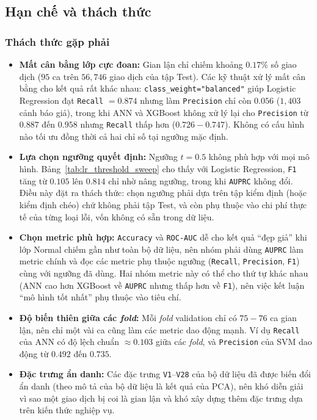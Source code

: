 \subsection{Hạn chế và thách thức}\label{subsec:han-che-thach-thuc}

\subsubsection{Thách thức gặp phải}
\begin{itemize}
    \item \textbf{Mất cân bằng lớp cực đoan:} Gian lận chỉ chiếm khoảng $0.17\%$ số giao dịch ($95$ ca trên $56{,}746$ giao dịch của tập Test). Các kỹ thuật xử lý mất cân bằng cho kết quả rất khác nhau: \texttt{class\_weight="balanced"} giúp Logistic Regression đạt \texttt{Recall} $= 0.874$ nhưng làm \texttt{Precision} chỉ còn $0.056$ ($1{,}403$ cảnh báo giả), trong khi ANN và XGBoost không xử lý lại cho \texttt{Precision} từ $0.887$ đến $0.958$ nhưng \texttt{Recall} thấp hơn ($0.726 - 0.747$). Không có cấu hình nào tối ưu đồng thời cả hai chỉ số tại ngưỡng mặc định.

    \item \textbf{Lựa chọn ngưỡng quyết định:} Ngưỡng $t = 0.5$ không phù hợp với mọi mô hình. Bảng~\ref{tab:lr_threshold_sweep} cho thấy với Logistic Regression, \texttt{F1} tăng từ $0.105$ lên $0.814$ chỉ nhờ nâng ngưỡng, trong khi \texttt{AUPRC} không đổi. Điều này đặt ra thách thức: chọn ngưỡng phải dựa trên tập kiểm định (hoặc kiểm định chéo) chứ không phải tập Test, và còn phụ thuộc vào chi phí thực tế của từng loại lỗi, vốn không có sẵn trong dữ liệu.

    \item \textbf{Chọn metric phù hợp:} \texttt{Accuracy} và \texttt{ROC-AUC} dễ cho kết quả ``đẹp giả'' khi lớp Normal chiếm gần như toàn bộ dữ liệu, nên nhóm phải dùng \texttt{AUPRC} làm metric chính và đọc các metric phụ thuộc ngưỡng (\texttt{Recall}, \texttt{Precision}, \texttt{F1}) cùng với ngưỡng đã dùng. Hai nhóm metric này có thể cho thứ tự khác nhau (ANN cao hơn XGBoost về \texttt{AUPRC} nhưng thấp hơn về \texttt{F1}), nên việc kết luận ``mô hình tốt nhất'' phụ thuộc vào tiêu chí.

    \item \textbf{Độ biến thiên giữa các \textit{fold}:} Mỗi \textit{fold} validation chỉ có $75 - 76$ ca gian lận, nên chỉ một vài ca cũng làm các metric dao động mạnh. Ví dụ \texttt{Recall} của ANN có độ lệch chuẩn $\approx 0.103$ giữa các \textit{fold}, và \texttt{Precision} của SVM dao động từ $0.492$ đến $0.735$.

    \item \textbf{Đặc trưng ẩn danh:} Các đặc trưng \texttt{V1}--\texttt{V28} của bộ dữ liệu đã được biến đổi ẩn danh (theo mô tả của bộ dữ liệu là kết quả của PCA), nên khó diễn giải vì sao một giao dịch bị coi là gian lận và khó xây dựng thêm đặc trưng dựa trên kiến thức nghiệp vụ.
\end{itemize}

